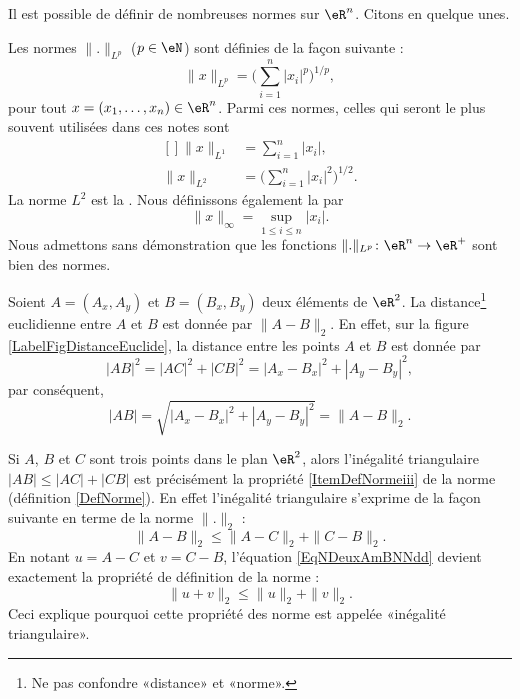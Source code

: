 Il est possible de définir de nombreuses normes sur $\eR^n$. Citons en quelque unes. 




Les normes $\| . \|_{L^p}$ ($p\in\eN$) sont définies de la façon suivante :
\begin{equation}		\label{EqDeformeLp}
	\| x \|_{L^p}=\Big( \sum_{i=1}^n| x_i |^p\Big)^{1/p},
\end{equation}
pour tout $x=(x_1,\ldots,x_n)\in\eR^n$. Parmi ces normes, celles qui seront le plus souvent utilisées dans ces notes sont
\begin{equation}
	\begin{aligned}[]
		\| x \|_{L^1}&=\sum_{i=1}^n| x_i |,\\
		\| x \|_{L^2}&=\Big( \sum_{i=1}^n| x_i |^2 \Big)^{1/2}.
	\end{aligned}
\end{equation}
La norme $L^2$ est la . Nous définissons également la  par
\begin{equation}
	\| x \|_{\infty}=\sup_{1\leq i\leq n}| x_i |.
\end{equation}
Nous admettons sans démonstration que les fonctions $\| . \|_{L^p}\colon \eR^n\to \eR^+$ sont bien des normes.

\newcommand{\CaptionFigDistanceEuclide}{La \emph{norme} euclidienne induit la \emph{distance} euclidienne. D'où son nom. Le point $C$ est construit aux coordonnées $(A_x,B_y)$.}


Soient $A=(A_x,A_y)$ et $B=(B_x,B_y)$ deux éléments de $\eR^2$. La distance\footnote{Ne pas confondre «distance» et «norme».} euclidienne entre $A$ et $B$ est donnée par $\| A-B \|_2$. En effet, sur la figure \ref{LabelFigDistanceEuclide}, la distance entre les points $A$ et $B$ est donnée par
\begin{equation}
	| AB |^2=| AC |^2+| CB |^2=| A_x-B_x |^2+| A_y-B_y |^2,
\end{equation}
par conséquent,
\begin{equation}
	| AB |=\sqrt{| A_x-B_x |^2+| A_y-B_y |^2}=\| A-B \|_2.
\end{equation}

\begin{remark}
	Si $A$, $B$ et $C$ sont trois points dans le plan $\eR^2$, alors l'inégalité triangulaire $| AB |\leq| AC |+| CB |$ est précisément la propriété \ref{ItemDefNormeiii} de la norme (définition \ref{DefNorme}). En effet l'inégalité triangulaire s'exprime de la façon suivante en terme de la norme $\| . \|_2$ :
	\begin{equation}	\label{EqNDeuxAmBNNdd}
		\| A-B \|_2\leq \| A-C \|_2+\| C-B \|_2.
	\end{equation}
	En notant $u=A-C$ et $v=C-B$, l'équation \eqref{EqNDeuxAmBNNdd} devient exactement la propriété de définition de la norme :
	\begin{equation}
		\| u+v \|_2\leq \| u \|_2+\| v \|_2.
	\end{equation}
	Ceci explique pourquoi cette propriété des norme est appelée «inégalité triangulaire».
\end{remark}

